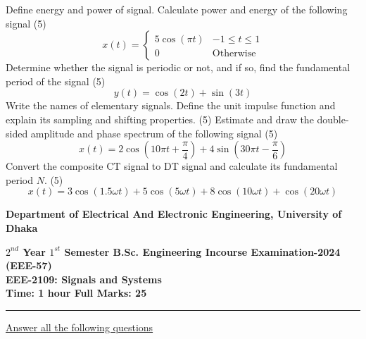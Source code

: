 \documentclass[a4paper,11pt]{exam}
\begin{document}
\begin{questions}
    \question Define energy and power of signal. Calculate power and energy of the following signal \hfill (5)
    $$ x(t) = \begin{cases}
        5\cos(\pi t) & -1\leq t \leq 1 \\
        0 & \text{Otherwise}
    \end{cases} $$
    \question Determine whether the signal is periodic or not, and if so, find the fundamental period of the signal \hfill (5) $$ y(t) = \cos(2t) + \sin (3t)$$
    \question Write the names of elementary signals. Define the unit impulse function and explain its sampling and shifting properties. \hfill (5)
    \question Estimate and draw the double-sided amplitude and phase spectrum of the following signal \hfill (5)
    $$x(t) = 2\cos(10\pi t+\dfrac{\pi}{4}) + 4\sin(30\pi t - \dfrac{\pi}{6})$$
    \question Convert the composite CT signal to DT signal and calculate its fundamental period $N$. \hfill (5)
    $$ x(t) = 3\cos(1.5\omega t)+5\cos(5\omega t) + 8\cos (10\omega t) + \cos(20\omega t) $$
\end{questions}
\newpage
\begin{center}
    \begin{large}
        {\textbf{
            Department of Electrical And Electronic Engineering, University of Dhaka \\
        }}
    \end{large}
    \textbf{$2^{nd}$ Year $1^{st}$ Semester B.Sc. Engineering Incourse Examination-2024 (EEE-57) \\
        EEE-2109: Signals and Systems\\
        Time: 1 hour \hfill Full Marks: 25}
    \noindent\rule{\linewidth}{1.2pt}
\end{center}
\underline{Answer all the following questions}
\end{document}
